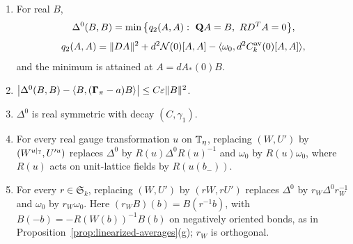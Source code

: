 \begin{proposition}\label{prop:hessian}
\begin{enumerate}[label=(\alph*)]
\item For real $B$,
\[
\Delta^0(B,B)=\min\big\{q_2(A,A):\ \mathbf Q A=B,\ RD^TA=0\big\},
\]
\[
q_2(A,A)=\|DA\|^2+d^2\mathcal N(0)[A,A]-\langle \omega_0,d^2C^{\rm av}_k(0)[A,A]\rangle,
\]
and the minimum is attained at $A=dA_*(0)B$.
\item $\big|\Delta^0(B,B)-\langle B,(\boldsymbol\Gamma_\pi-a)B\rangle\big|\le C\varepsilon\|B\|^2$.
\item $\Delta^0$ is real symmetric with decay $(C,\gamma_1)$.
\item For every real gauge transformation $u$ on $\mathbb T_\eta$, replacing $(W,U')$ by $(W^{u|_\mathbb T},U'^u)$ replaces $\Delta^0$ by $R(u)\Delta^0R(u)^{-1}$ and $\omega_0$ by $R(u)\omega_0$, where $R(u)$ acts on unit-lattice fields by $R(u(b_-))$.
\item For every $r\in\mathfrak S_k$, replacing $(W,U')$ by $(rW,rU')$ replaces $\Delta^0$ by $r_W\Delta^0r_W^{-1}$ and $\omega_0$ by $r_W\omega_0$. Here $(r_WB)(b)=B(r^{-1}b)$, with $B(-b)=-R(W(b))^{-1}B(b)$ on negatively oriented bonds, as in Proposition~\ref{prop:linearized-averages}(g); $r_W$ is orthogonal.
\end{enumerate}
\end{proposition}

